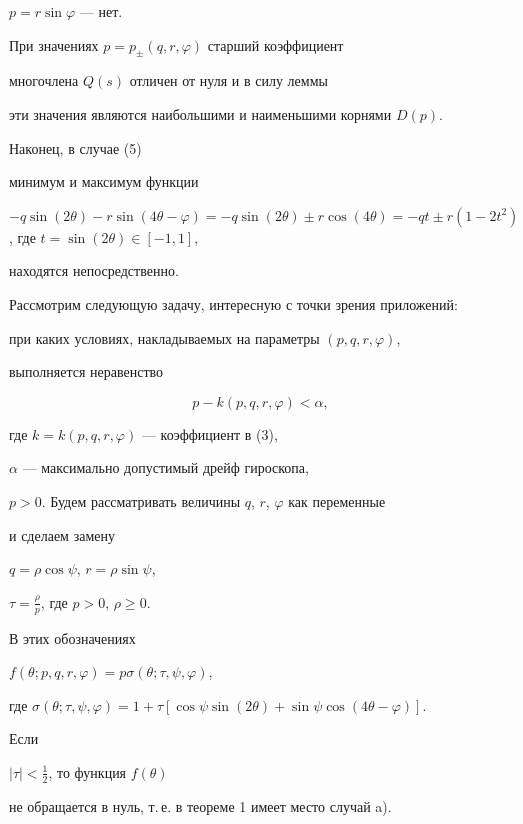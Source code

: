 \begin{pf}
$p=r \sin \varphi$ --- нет.


При значениях $p=p_\pm (q,r,\varphi)$ старший коэффициент


многочлена $Q(s)$ отличен от нуля и в силу леммы


эти значения являются наибольшими и наименьшими корнями $D(p)$.


Наконец, в случае (5)


минимум и максимум функции


$-q\sin(2\theta)-r\sin(4\theta-\varphi)=-q\sin(2\theta)\pm r\cos(4\theta)=


-qt \pm r(1-2t^2)$, где $t=\sin (2 \theta) \in [-1,1]$,


находятся непосредственно.


\end{pf}





Рассмотрим следующую задачу, интересную с точки зрения приложений:


при каких условиях, накладываемых на параметры $(p,q,r,\varphi)$,


выполняется неравенство


\begin{equation}


p - k(p,q,r,\varphi) < \alpha,


\end{equation}


где $k=k(p,q,r,\varphi)$ --- коэффициент в (3),


$\alpha$ --- максимально допустимый дрейф гироскопа,


$p > 0$. Будем рассматривать величины $q$, $r$, $\varphi$ как переменные


и сделаем замену


$q=\rho \cos \psi$, $r=\rho \sin \psi$,


$\tau=\frac{\rho}{p}$, где $p>0$, $\rho \ge 0$.


В этих обозначениях


$f(\theta ;p,q,r,\varphi)=p\sigma (\theta ;\tau,\psi, \varphi)$,


где $\sigma (\theta ;\tau,\psi, \varphi)=1+\tau [\cos \psi \sin (2\theta)


+\sin \psi \cos (4\theta - \varphi)]$.


Если


$| \tau | <\frac{1}{2}$, то функция $f(\theta)$


не обращается в нуль, т.\,е. в теореме 1 имеет место случай a).


